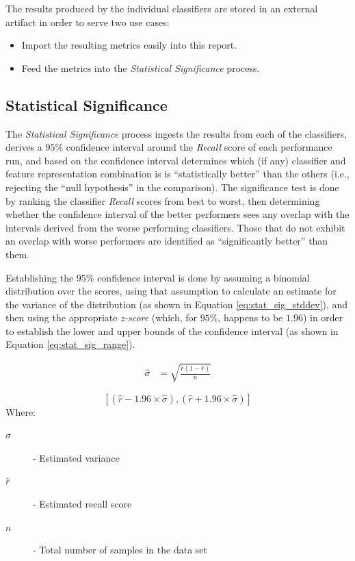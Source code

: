 \documentclass[conference]{sig-alternate-05-2015}
\begin{document}
The results produced by the individual classifiers are stored in an external
artifact in order to serve two use cases:

\begin{itemize}
  \item Import the resulting metrics easily into this report.
  \item Feed the metrics into the \textit{Statistical Significance} process.
\end{itemize}

\subsection{Statistical Significance}\label{subsec:stat_significance}
The \textit{Statistical Significance} process ingests the results from each of
the classifiers, derives a $95$\% confidence interval around the \textit{Recall}
score of each performance run, and based on the confidence interval determines
which (if any) classifier and feature representation combination is is
``statistically better'' than the others (i.e., rejecting the
``null hypothesis'' in the comparison). The significance test is done by ranking
the classifier \textit{Recall} scores from best to worst, then determining
whether the confidence interval of the better performers sees any overlap with
the intervals derived from the worse performing classifiers. Those that do not
exhibit an overlap with worse performers are identified as ``significantly
better'' than them.\par

Establishing the $95\%$ confidence interval is done by
assuming a binomial distribution over the scores, using that assumption to
calculate an estimate for the variance of the distribution (as shown
in Equation \ref{eq:stat_sig_stddev}), and then using the appropriate
\textit{z-score} (which, for $95\%$, happens to be $1.96$) in order to establish
the lower and upper bounds of the confidence interval (as shown in Equation
\ref{eq:stat_sig_range}).\par

\noindent\hrulefill
\begin{equation}
  \label{eq:stat_sig_stddev}
  \begin{aligned}
    \hat{\sigma} &= \sqrt{\frac{\hat{r}(1-\hat{r})}{n}}
  \end{aligned}
\end{equation}

\begin{equation}
  \label{eq:stat_sig_range}
  [(\hat{r} - 1.96 \times \hat{\sigma}), (\hat{r} + 1.96 \times \hat{\sigma})]
\end{equation}
\noindent Where:
\begin{description}
  \item[$\hat{\sigma}$] - Estimated variance
  \item[$\hat{r}$] - Estimated recall score
  \item[$n$] - Total number of samples in the data set  
\end{description}
\noindent\hrulefill
\end{document}
